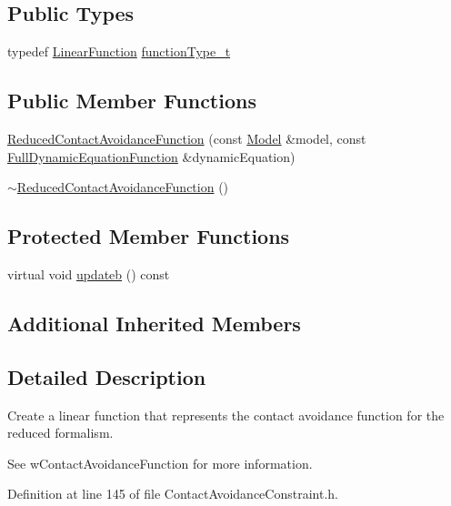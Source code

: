 \subsection*{Public Types}
\begin{DoxyCompactItemize}
\item 
typedef \hyperlink{classocra_1_1LinearFunction}{Linear\+Function} \hyperlink{classocra_1_1ReducedContactAvoidanceFunction_ae1d0c9b1c213515eabdb15cb7dc82869}{function\+Type\+\_\+t}
\end{DoxyCompactItemize}
\subsection*{Public Member Functions}
\begin{DoxyCompactItemize}
\item 
\hyperlink{classocra_1_1ReducedContactAvoidanceFunction_ae2183d53a13985590ee4f5cf59083803}{Reduced\+Contact\+Avoidance\+Function} (const \hyperlink{classocra_1_1Model}{Model} \&model, const \hyperlink{classocra_1_1FullDynamicEquationFunction}{Full\+Dynamic\+Equation\+Function} \&dynamic\+Equation)
\item 
\hyperlink{classocra_1_1ReducedContactAvoidanceFunction_a7a1844143947f714f2e0207d9f56834a}{$\sim$\+Reduced\+Contact\+Avoidance\+Function} ()
\end{DoxyCompactItemize}
\subsection*{Protected Member Functions}
\begin{DoxyCompactItemize}
\item 
virtual void \hyperlink{classocra_1_1ReducedContactAvoidanceFunction_a8765dc0c96aed5641f57f615690dcdb8}{updateb} () const 
\end{DoxyCompactItemize}
\subsection*{Additional Inherited Members}


\subsection{Detailed Description}
Create a linear function that represents the contact avoidance function for the reduced formalism. 

See w\+Contact\+Avoidance\+Function for more information. 

Definition at line 145 of file Contact\+Avoidance\+Constraint.\+h.



